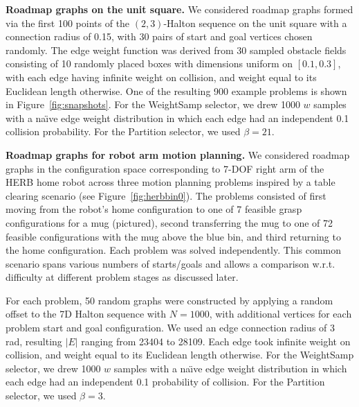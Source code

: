 \documentclass[nobib]{tufte-book}
\begin{document}
\textbf{Roadmap graphs on the unit square.}
We considered roadmap graphs formed via the first 100 points
of the $(2,3)$-Halton sequence on the unit square
with a connection radius of 0.15,
with 30 pairs of start and goal vertices chosen randomly.
The edge weight function was derived from 30 sampled obstacle fields
consisting of 10 randomly placed boxes
with dimensions uniform on $[0.1,0.3]$,
with each edge having infinite weight on collision,
and weight equal to its Euclidean length otherwise.
One of the resulting 900 example problems is shown in
Figure~\ref{fig:snapshots}.
For the WeightSamp selector,
we drew 1000 $w$ samples
with a na\"{\i}ve edge weight distribution in which
each edge had an independent 0.1 collision probability.
For the Partition selector, we used $\beta = 21$.

\textbf{Roadmap graphs for robot arm motion planning.}
We considered roadmap graphs in the configuration space
corresponding to 7-DOF right arm of the HERB home robot across three
motion planning problems inspired by a table clearing scenario
(see Figure~\ref{fig:herbbin0}).
The problems consisted of first moving from the robot's
home configuration to one of 7 feasible grasp configurations for a mug
(pictured),
second transferring the mug to one of 72 feasible configurations with
the mug above the blue bin,
and third returning to the home configuration.
Each problem was solved independently.
This common scenario spans various numbers of starts/goals
and allows a comparison w.r.t. difficulty at different problem
stages as discussed later.

For each problem,
50 random graphs were constructed by applying a random offset to
the 7D Halton sequence with $N = 1000$,
with additional vertices for each problem start and goal configuration.
We used an edge connection radius of 3 rad,
resulting $|E|$ ranging from 23404 to 28109.
Each edge took infinite weight on collision,
and weight equal to its Euclidean length otherwise.
For the WeightSamp selector,
we drew 1000 $w$ samples
with a na\"{\i}ve edge weight distribution in which
each edge had an independent 0.1 probability of collision.
For the Partition selector, we used $\beta = 3$.
\end{document}
